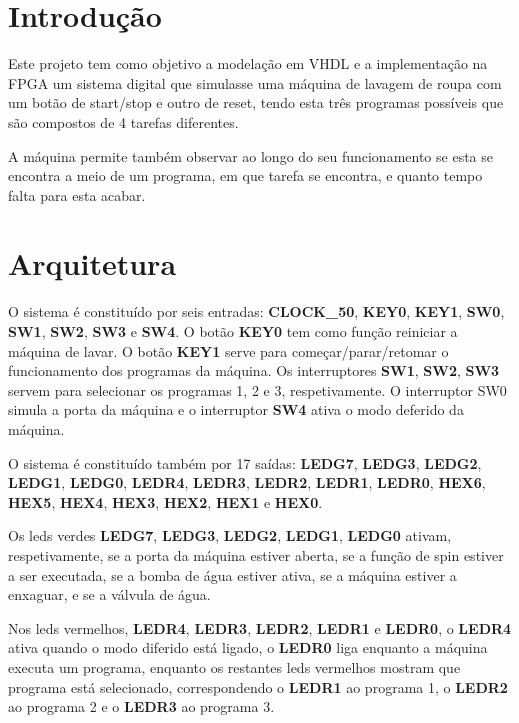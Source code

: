 \documentclass[11pt,twoside,a4paper]{report}
\begin{document}
%
%

\tableofcontents


\chapter{Introdução}

	Este projeto tem como objetivo a modelação em VHDL e a implementação na FPGA um sistema digital que simulasse uma máquina de lavagem de roupa com um botão de start/stop e outro de reset, tendo esta três programas possíveis que são compostos de 4 tarefas diferentes.

	A máquina permite também observar ao longo do seu funcionamento se esta se encontra a meio de um programa, em que tarefa se encontra, e quanto tempo falta para esta acabar.


\chapter{Arquitetura}

 O sistema é constituído por seis entradas: \textbf{CLOCK\_50}, \textbf{KEY0}, \textbf{KEY1}, \textbf{SW0}, \textbf{SW1}, \textbf{SW2}, \textbf{SW3} e \textbf{SW4}. O botão \textbf{KEY0} tem como função reiniciar a máquina de lavar. O botão \textbf{KEY1} serve para começar/parar/retomar o funcionamento dos programas da máquina. Os interruptores \textbf{SW1}, \textbf{SW2}, \textbf{SW3} servem para selecionar os programas 1, 2 e 3, respetivamente. O interruptor SW0 simula a porta da máquina e o interruptor \textbf{SW4} ativa o modo deferido da máquina. 
 
 O sistema é constituído também por 17 saídas: \textbf{LEDG7}, \textbf{LEDG3}, \textbf{LEDG2}, \textbf{LEDG1}, \textbf{LEDG0}, \textbf{LEDR4}, \textbf{LEDR3}, \textbf{LEDR2}, \textbf{LEDR1}, \textbf{LEDR0}, \textbf{HEX6}, \textbf{HEX5}, \textbf{HEX4}, \textbf{HEX3}, \textbf{HEX2}, \textbf{HEX1} e \textbf{HEX0}. 
 
 Os leds verdes \textbf{LEDG7}, \textbf{LEDG3}, \textbf{LEDG2}, \textbf{LEDG1}, \textbf{LEDG0} ativam, respetivamente, se a porta da máquina estiver aberta, se a função de spin estiver a ser executada, se a bomba de água estiver ativa, se a máquina estiver a enxaguar, e se a válvula de água. 
 
 Nos leds vermelhos, \textbf{LEDR4}, \textbf{LEDR3}, \textbf{LEDR2}, \textbf{LEDR1} e \textbf{LEDR0}, o \textbf{LEDR4} ativa quando o modo diferido está ligado, o \textbf{LEDR0} liga enquanto a máquina executa um programa, enquanto os restantes leds vermelhos mostram que programa está selecionado, correspondendo o \textbf{LEDR1} ao programa 1, o \textbf{LEDR2} ao programa 2 e o \textbf{LEDR3} ao programa 3.
 
\end{document}
